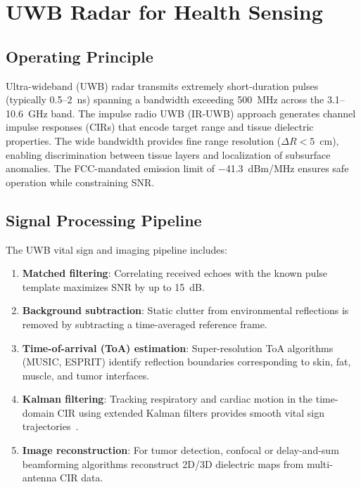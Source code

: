 \documentclass[journal,twoside]{IEEEtran}
\begin{document}
\section{UWB Radar for Health Sensing}

\subsection{Operating Principle}
Ultra-wideband (UWB) radar transmits extremely short-duration pulses (typically 0.5--2~ns) spanning a bandwidth exceeding 500~MHz across the 3.1--10.6~GHz band. The impulse radio UWB (IR-UWB) approach generates channel impulse responses (CIRs) that encode target range and tissue dielectric properties. The wide bandwidth provides fine range resolution ($\Delta R < 5$~cm), enabling discrimination between tissue layers and localization of subsurface anomalies. The FCC-mandated emission limit of $-$41.3~dBm/MHz ensures safe operation while constraining SNR.

\subsection{Signal Processing Pipeline}
The UWB vital sign and imaging pipeline includes:
\begin{enumerate}
\item \textbf{Matched filtering}: Correlating received echoes with the known pulse template maximizes SNR by up to 15~dB.
\item \textbf{Background subtraction}: Static clutter from environmental reflections is removed by subtracting a time-averaged reference frame.
\item \textbf{Time-of-arrival (ToA) estimation}: Super-resolution ToA algorithms (MUSIC, ESPRIT) identify reflection boundaries corresponding to skin, fat, muscle, and tumor interfaces.
\item \textbf{Kalman filtering}: Tracking respiratory and cardiac motion in the time-domain CIR using extended Kalman filters provides smooth vital sign trajectories~\cite{ref_kalman_uwb2024}.
\item \textbf{Image reconstruction}: For tumor detection, confocal or delay-and-sum beamforming algorithms reconstruct 2D/3D dielectric maps from multi-antenna CIR data.
\end{enumerate}
\end{document}
